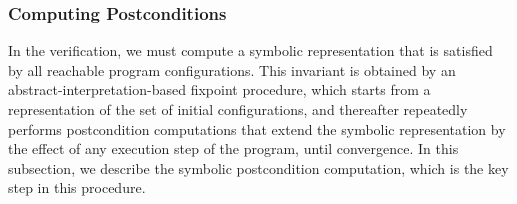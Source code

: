 \subsubsection{Computing Postconditions}
\label{subsect:postcond}
In the  verification, we must compute a symbolic representation
that is satisfied by all reachable program configurations.
This invariant is obtained by an abstract-interpretation-based
fixpoint procedure, which starts
from a representation of the set of initial configurations, and
thereafter repeatedly performs
postcondition computations that extend the
symbolic representation by the effect of any execution step of the program,
until convergence.
In this subsection, we describe the symbolic postcondition computation, which
is the key step in this procedure.

  


